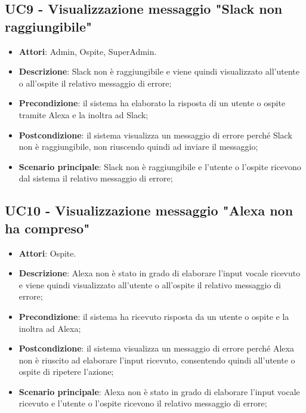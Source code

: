 \documentclass[../AnalisiDeiRequisiti_v4.0.0.tex]{subfiles}
\begin{document}
\subsection{UC9 - Visualizzazione messaggio "Slack non raggiungibile"} 
\label{sssec:UC9} 
\begin{itemize} 
\item \textbf{Attori}: Admin, Ospite, SuperAdmin.
\item \textbf{Descrizione}: Slack non è raggiungibile e viene quindi visualizzato all'utente o all'ospite il relativo messaggio di errore;
\item \textbf{Precondizione}: il sistema ha elaborato la risposta di un utente o ospite tramite Alexa e la inoltra ad Slack;
\item \textbf{Postcondizione}: il sistema visualizza un messaggio di errore perché Slack non è raggiungibile, non riuscendo quindi ad inviare il messaggio;
\item \textbf{Scenario principale}: Slack non è raggiungibile e l'utente o l'ospite ricevono dal sistema il relativo messaggio di errore;
\end{itemize} 
\subsection{UC10 - Visualizzazione messaggio "Alexa non ha compreso"} 
\label{sssec:UC10} 
\begin{itemize} 
\item \textbf{Attori}: Ospite.
\item \textbf{Descrizione}: Alexa non è stato in grado di elaborare l'input vocale ricevuto e viene quindi visualizzato all'utente o all'ospite il relativo messaggio di errore;
\item \textbf{Precondizione}: il sistema ha ricevuto risposta da un utente o ospite e la inoltra ad Alexa;
\item \textbf{Postcondizione}: il sistema visualizza un messaggio di errore perché Alexa non è riuscito ad elaborare l'input ricevuto, consentendo quindi all'utente o ospite di ripetere l'azione;
\item \textbf{Scenario principale}: Alexa non è stato in grado di elaborare l'input vocale ricevuto e l'utente o l'ospite ricevono il relativo messaggio di errore;
\end{itemize} 
\end{document}
